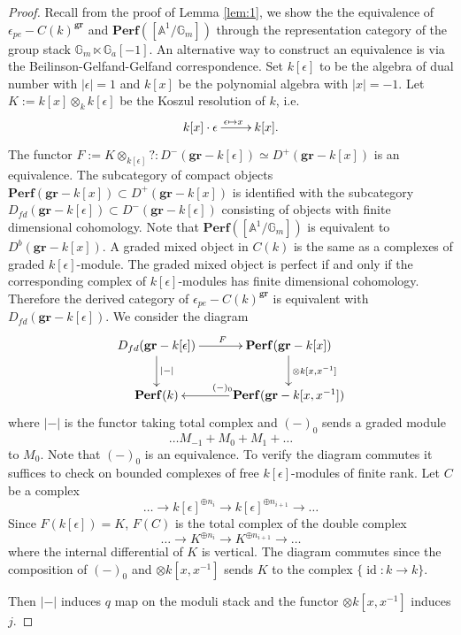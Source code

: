 \documentclass[reqno]{amsart}
\theoremstyle{definition}
\theoremstyle{remark}
\newcommand{\G}{{\mathbb G}}
\newcommand{\A}{{\mathbb A}}
\newcommand{\ot}{\otimes}
\newcommand{\id}{\operatorname{id}}
\newcommand{\eps}{\epsilon}
\newcommand{\perf}{\mathbf{Perf}}
\newcommand{\gr}{\mathbf{gr}}
\numberwithin{equation}{section}
\begin{document}
\begin{proof}
Recall from the proof of Lemma \ref{lem:1}, we show the the equivalence of $\eps_{pe}-C(k)^\gr$ and $\perf([\A^1\big/\G_m])$ through the representation category of the group stack $\G_m\ltimes \G_a[-1]$. An alternative way to construct an equivalence is via the Beilinson-Gelfand-Gelfand correspondence. Set $k[\eps]$ to be the algebra of dual number  with $|\eps|=1$ and  $k[x]$ be the polynomial algebra with $|x|=-1$. Let $K:=k[x]\ot_k k[\eps]$ be the Koszul resolution of $k$, i.e. 
\[\xymatrix{
k[x]\cdot\eps \ar[r]^{\eps\mapsto x}  &k[x].}
\]
The functor $F:=K\ot_{k[\eps]}? : D^-(\gr-k[\eps])\simeq D^+(\gr-k[x])$ is an equivalence. The subcategory of compact objects $\perf(\gr-k[x])\subset D^+(\gr-k[x])$ is identified with the subcategory $D_{fd}(\gr-k[\eps])\subset D^-(\gr-k[\eps])$ consisting of objects with finite dimensional cohomology. Note that $\perf([\A^1\big/\G_m])$ is equivalent to $D^b(\gr-k[x])$. A graded mixed object in $C(k)$ is the same as a complexes of graded $k[\eps]$-module. The graded mixed object is perfect if and only if the corresponding complex of $k[\eps]$-modules has finite dimensional cohomology. Therefore the derived category of $\eps_{pe}-C(k)^\gr$ is equivalent with $D_{fd}(\gr-k[\eps])$. We consider the diagram
\[
\xymatrix{
D_{fd}(\gr-k[\eps])\ar[r]^F\ar[d]^{|-|} & \perf(\gr-k[x])\ar[d]^{\ot k[x,x^{-1}]}\\
\perf(k) & \perf(\gr-k[x,x^{-1}])\ar[l] _{(-)_0}
}
\] where $|-|$ is the functor taking total complex and $(-)_0$ sends a graded module 
\[
\ldots M_{-1}+M_0+M_1+\ldots
\] to $M_0$. Note that $(-)_0$ is an equivalence. To verify 
the diagram commutes it suffices to check on bounded complexes of free $k[\eps]$-modules of finite rank. 
Let $C$ be a complex
\[
\ldots \to k[\eps]^{\oplus n_i}\to k[\eps]^{\oplus n_{i+1}}\to\ldots
\]
Since $F(k[\eps])=K$, $F(C)$ is the total complex of the double complex
\[
\ldots \to K^{\oplus n_i}\to K^{\oplus n_{i+1}}\to\ldots
\] where the internal differential of $K$ is vertical. The diagram commutes since the composition of $(-)_0$ and $\ot k[x,x^{-1}]$ sends $K$ to the complex $\{\id: k\to k\}$.

Then $|-|$ induces $q$ map on the moduli stack and the functor $\ot k[x,x^{-1}]$ induces $j$.

\end{proof}
\end{document}
